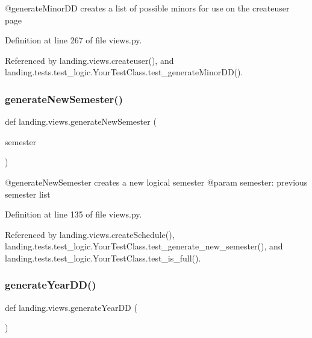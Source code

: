 \begin{DoxyVerb}@generateMinorDD creates a list of possible minors for use on the createuser page
\end{DoxyVerb}
 

Definition at line 267 of file views.\+py.



Referenced by landing.\+views.\+createuser(), and landing.\+tests.\+test\+\_\+logic.\+Your\+Test\+Class.\+test\+\_\+generate\+Minor\+D\+D().

\mbox{\label{namespacelanding_1_1views_a219fcf8f07fa2eeaf2f31ad6d7fc6905}} 
\subsubsection{\texorpdfstring{generate\+New\+Semester()}{generateNewSemester()}}
{\footnotesize\ttfamily def landing.\+views.\+generate\+New\+Semester (\begin{DoxyParamCaption}\item[{}]{semester }\end{DoxyParamCaption})}

\begin{DoxyVerb}@generateNewSemester creates a new logical semester
@param semester: previous semester list
\end{DoxyVerb}
 

Definition at line 135 of file views.\+py.



Referenced by landing.\+views.\+create\+Schedule(), landing.\+tests.\+test\+\_\+logic.\+Your\+Test\+Class.\+test\+\_\+generate\+\_\+new\+\_\+semester(), and landing.\+tests.\+test\+\_\+logic.\+Your\+Test\+Class.\+test\+\_\+is\+\_\+full().

\mbox{\label{namespacelanding_1_1views_a07d432deb07b33da6ab263caafabb819}} 
\subsubsection{\texorpdfstring{generate\+Year\+D\+D()}{generateYearDD()}}
{\footnotesize\ttfamily def landing.\+views.\+generate\+Year\+DD (\begin{DoxyParamCaption}{ }\end{DoxyParamCaption})}

